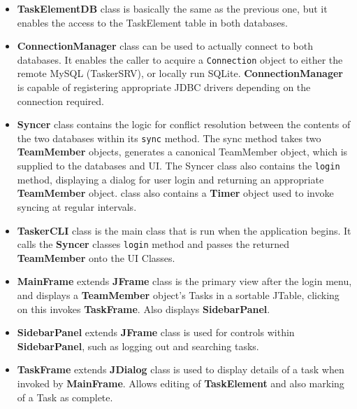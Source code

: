 \documentclass{project}
\begin{document}
\begin{itemize}
  		\item \textbf{TaskElementDB} class is basically the same as the previous one, but it enables the access to the TaskElement table in both databases.
  		\item \textbf{ConnectionManager} class can be used to actually connect to both databases. It enables the caller to acquire a \texttt{Connection} object to either the remote MySQL (TaskerSRV), or locally run SQLite. \textbf{ConnectionManager} is capable of registering appropriate JDBC drivers depending on the connection required. 
        \item \textbf{Syncer} class contains the logic for conflict resolution between the contents of the two databases within its \texttt{sync} method. The sync method takes two \textbf{TeamMember} objects, generates a canonical TeamMember object, which is supplied to the databases and UI. The Syncer class also contains the \texttt{login} method, displaying a dialog for user login and returning an appropriate \textbf{TeamMember} object.
        class also contains a \textbf{Timer} object used to invoke syncing at regular intervals.
        \item \textbf{TaskerCLI} class is the main class that is run when the application begins. It calls the \textbf{Syncer} classes \texttt{login} method and passes the returned \textbf{TeamMember} onto the UI Classes.
        \item \textbf{MainFrame} extends \textbf{JFrame} class is the primary view after the login menu, and displays a \textbf{TeamMember} object's Tasks in a sortable JTable, clicking on this invokes \textbf{TaskFrame}. Also displays \textbf{SidebarPanel}.
        \item \textbf{SidebarPanel} extends \textbf{JFrame} class is used for controls within \textbf{SidebarPanel}, such as logging out and searching tasks.
        \item \textbf{TaskFrame} extends \textbf{JDialog} class is used to display details of a task when invoked by \textbf{MainFrame}. Allows editing of \textbf{TaskElement} and also marking of a Task as complete.
  \end{itemize}
\clearpage  
  
\end{document}

